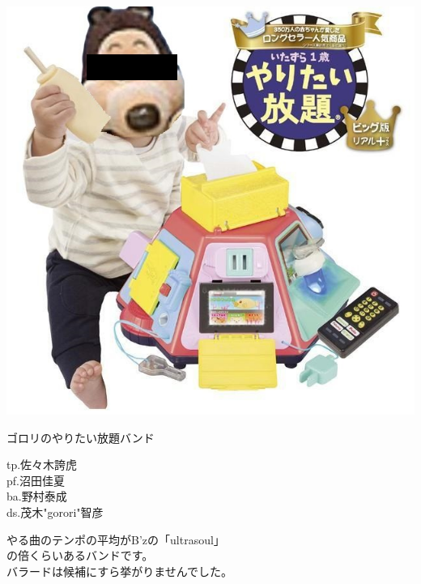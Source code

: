 \documentclass[a4paper]{article}
\begin{document}
\begin{minipage}{0.25\textheight}
    \includegraphics[width=0.25\textheight]{./FULLHOUSE/resources/1.jpg}
\end{minipage}
\begin{minipage}{\textwidth - 0.25\textheight}
  \Huge ゴロリのやりたい放題バンド\vspace{1em} \normalsize\\
    \begin{minipage}{14em}
        \Large
        tp.佐々木誇虎\\pf.沼田佳夏\\ba.野村泰成\\ds.茂木"gorori"智彦
    \end{minipage}
    \begin{minipage}{\textwidth - 15em}
        \large
        やる曲のテンポの平均がB'zの「ultrasoul」\\の倍くらいあるバンドです。\\バラードは候補にすら挙がりませんでした。
    \end{minipage}
\end{minipage}
\end{document}
